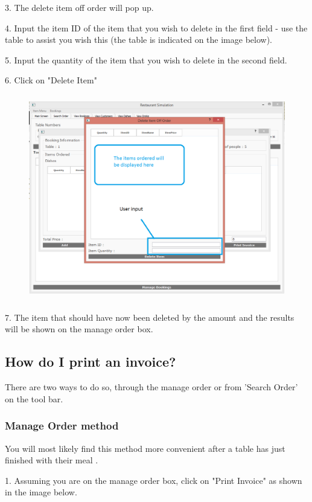 3. The delete item off order will pop up.

4. Input the item ID of the item that you wish to delete in the first field - use the table to assist you wish this (the table is indicated on the image below).

5. Input the quantity of the item that you wish to delete in the second field.

6. Click on "Delete Item"


\begin{figure}[H]
    \includegraphics[height = 9cm]{./Manual/images/DeleteItemOrder2} 
    \caption{} \label{fig:deleteitemorder3}
\end{figure}

7. The item that should have now been deleted by the amount and the results will be shown on the manage order box.

\newpage
\subsection{How do I print an invoice?}
There are two ways to do so, through the manage order or from 'Search Order' on the tool bar.

\subsubsection{Manage Order method}
You will most likely find this method more convenient after a table has just finished with their meal .

1. Assuming you are on the manage order box, click on "Print Invoice" as shown in the image below.

